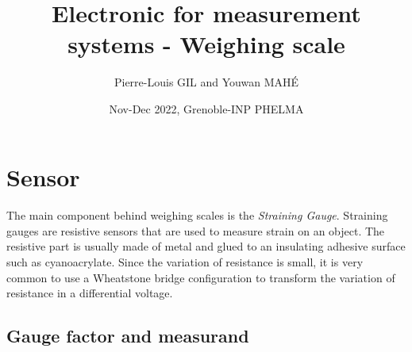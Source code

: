 \documentclass{article}[12pt]
\title{Electronic for measurement systems - Weighing scale}
\author{Pierre-Louis GIL and Youwan MAHÉ}
\date{Nov-Dec 2022, Grenoble-INP PHELMA}
\begin{document}
\maketitle
\tableofcontents
\newpage

\section{Sensor}
\paragraph{}
The main component behind weighing scales is the \emph{Straining Gauge}. Straining gauges are resistive sensors that are used to measure strain on an object. The resistive part is usually made of metal and glued to an insulating adhesive surface such as cyanoacrylate. Since the variation of resistance is  small, it is very common to use a Wheatstone bridge configuration to transform the variation of resistance in a differential voltage.
\subsection{Gauge factor and measurand}
\end{document}
